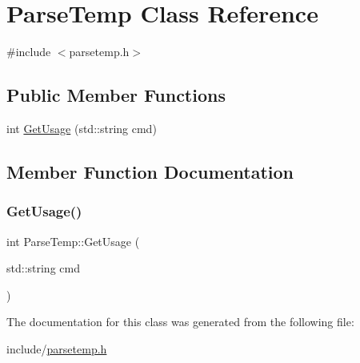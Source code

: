 \hypertarget{classParseTemp}{}\section{Parse\+Temp Class Reference}
\label{classParseTemp}


{\ttfamily \#include $<$parsetemp.\+h$>$}

\subsection*{Public Member Functions}
\begin{DoxyCompactItemize}
\item 
int \mbox{\hyperlink{classParseTemp_a8ec133a4da11cf376bb9c72397e9ae15}{Get\+Usage}} (std\+::string cmd)
\end{DoxyCompactItemize}


\subsection{Member Function Documentation}
\mbox{\label{classParseTemp_a8ec133a4da11cf376bb9c72397e9ae15}} 
\subsubsection{\texorpdfstring{GetUsage()}{GetUsage()}}
{\footnotesize\ttfamily int Parse\+Temp\+::\+Get\+Usage (\begin{DoxyParamCaption}\item[{std\+::string}]{cmd }\end{DoxyParamCaption})\hspace{0.3cm}{\ttfamily [inline]}}



The documentation for this class was generated from the following file\+:\begin{DoxyCompactItemize}
\item 
include/\mbox{\hyperlink{parsetemp_8h}{parsetemp.\+h}}\end{DoxyCompactItemize}
